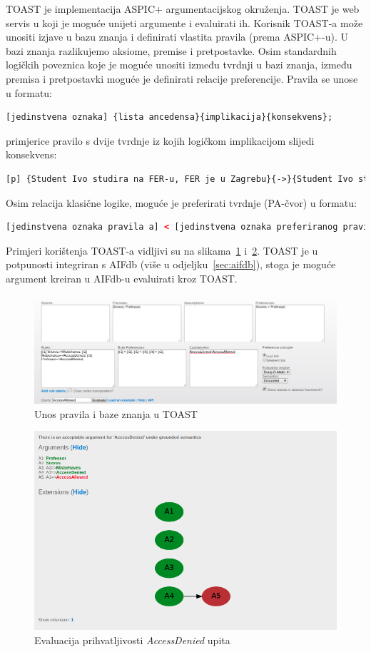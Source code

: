 TOAST  je implementacija ASPIC+ 
\citep{modgil2014aspic+} argumentacijskog okruženja. TOAST je web servis 
u koji je moguće unijeti argumente i evaluirati ih. 
Korisnik TOAST-a može unositi izjave u bazu znanja 
i definirati vlastita pravila  (prema ASPIC+-u). U bazi znanja 
razlikujemo aksiome, premise i pretpostavke. Osim standardnih logičkih
poveznica koje je moguće unositi između tvrdnji u bazi znanja, 
između premisa i pretpostavki moguće je definirati relacije preferencije. 
Pravila se unose u formatu:
\lstset{language=XML}
\begin{lstlisting}[caption={},label={lst:format},language=XML, captionpos=b]
[jedinstvena oznaka] {lista ancedensa}{implikacija}{konsekvens};
\end{lstlisting}
primjerice pravilo s dvije tvrdnje iz kojih logičkom implikacijom slijedi konsekvens:
\lstset{language=XML}
\begin{lstlisting}[caption={},label={lst:format},language=XML, captionpos=b]
[p] {Student Ivo studira na FER-u, FER je u Zagrebu}{->}{Student Ivo studira u Zagrebu};
\end{lstlisting}
Osim relacija klasične logike, moguće je preferirati tvrdnje (PA-čvor) u formatu:
\lstset{language=XML}
\begin{lstlisting}[caption={},label={lst:format},language=XML, captionpos=b]
    [jedinstvena oznaka pravila a] < [jedinstvena oznaka preferiranog pravila b] 
\end{lstlisting}
Primjeri korištenja TOAST-a vidljivi su na slikama~\ref{fig:toast_in} i~\ref{fig:toast}.
TOAST je u potpunosti integriran s AIFdb (više u odjeljku~\ref{sec:aifdb}), stoga je 
moguće argument kreiran u AIFdb-u evaluirati kroz TOAST.\@

\begin{figure}
    \includegraphics[scale=0.4]{toast_input.png}
    \caption{Unos pravila i baze znanja u TOAST}
\label{fig:toast_in}
\end{figure}

\begin{figure}
    \includegraphics[scale=0.4]{toast.png}
    \caption{Evaluacija prihvatljivosti \emph{AccessDenied} upita}
\label{fig:toast}
\end{figure}

